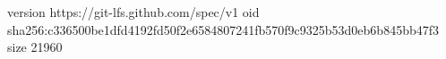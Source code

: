 version https://git-lfs.github.com/spec/v1
oid sha256:c336500be1dfd4192fd50f2e6584807241fb570f9c9325b53d0eb6b845bb47f3
size 21960
